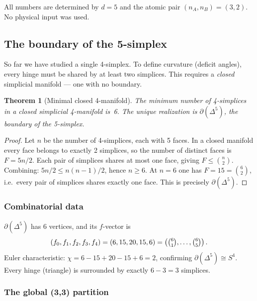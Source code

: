 \documentclass[12pt]{article}
\newtheorem{theorem}{Theorem}[section]
\theoremstyle{remark}
\theoremstyle{definition}
\begin{document}
All numbers are determined by $d = 5$ and the atomic pair $(n_A, n_B) = (3, 2)$. No physical input was used.

\subsection{The boundary of the 5-simplex}
\label{sec:boundary_5simplex}

So far we have studied a single 4-simplex.  To define curvature (deficit angles), every hinge must be shared by at least two simplices.  This requires a \emph{closed} simplicial manifold --- one with no boundary.

\begin{theorem}[Minimal closed 4-manifold]
\label{thm:minimal_closed}
The minimum number of 4-simplices in a closed simplicial 4-manifold is~6.  The unique realization is $\partial(\Delta^5)$, the boundary of the 5-simplex.
\end{theorem}

\begin{proof}
Let $n$ be the number of 4-simplices, each with 5 faces.  In a closed manifold every face belongs to exactly 2 simplices, so the number of distinct faces is $F = 5n/2$.  Each pair of simplices shares at most one face, giving $F \leq \binom{n}{2}$.  Combining: $5n/2 \leq n(n{-}1)/2$, hence $n \geq 6$.  At $n = 6$ one has $F = 15 = \binom{6}{2}$, i.e.\ every pair of simplices shares exactly one face.  This is precisely $\partial(\Delta^5)$.
\end{proof}

\subsubsection{Combinatorial data}

$\partial(\Delta^5)$ has 6 vertices, and its $f$-vector is
\begin{equation}
(f_0, f_1, f_2, f_3, f_4) = (6, 15, 20, 15, 6) = \left(\tbinom{6}{1},\ldots,\tbinom{6}{5}\right).
\end{equation}
Euler characteristic: $\chi = 6 - 15 + 20 - 15 + 6 = 2$, confirming $\partial(\Delta^5) \cong S^4$.  Every hinge (triangle) is surrounded by exactly $6 - 3 = 3$ simplices.

\subsubsection{The global (3,3) partition}
\end{document}
